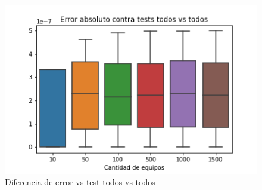 \begin{figure}[H]
 \centering
 \includegraphics[scale=0.7]{imagenes/todosVsTodos.png}
 \caption{Diferencia de error vs test todos vs todos}
 \label{fig:todosVsTodos}
\end{figure}


